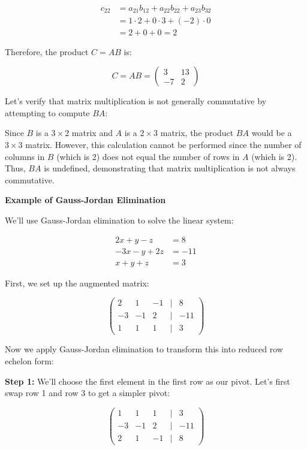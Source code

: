 \begin{align*}
    c_{22} &= a_{21}b_{12} + a_{22}b_{22} + a_{23}b_{32} \\
    &= 1 \cdot 2 + 0 \cdot 3 + (-2) \cdot 0 \\
    &= 2 + 0 + 0 = 2
\end{align*}

Therefore, the product \(C = AB\) is:

\[
    C = AB = 
    \begin{pmatrix}
    3 & 13 \\
    -7 & 2
    \end{pmatrix}
\]

Let's verify that matrix multiplication is not generally commutative by attempting to compute \(BA\):

Since \(B\) is a \(3 \times 2\) matrix and \(A\) is a \(2 \times 3\) matrix, the product \(BA\) would be a \(3 \times 3\) matrix. However, this calculation cannot be performed since the number of columns in \(B\) (which is 2) does not equal the number of rows in \(A\) (which is 2). Thus, \(BA\) is undefined, demonstrating that matrix multiplication is not always commutative.

\textbf{Example of Gauss-Jordan Elimination}

We'll use Gauss-Jordan elimination to solve the linear system:

\begin{align*}
    2x + y - z &= 8 \\
    -3x - y + 2z &= -11 \\
    x + y + z &= 3
\end{align*}

First, we set up the augmented matrix:

\[
    \begin{pmatrix}
    2 & 1 & -1 & | & 8 \\
    -3 & -1 & 2 & | & -11 \\
    1 & 1 & 1 & | & 3
    \end{pmatrix}
\]

Now we apply Gauss-Jordan elimination to transform this into reduced row echelon form:

\textbf{Step 1:} We'll choose the first element in the first row as our pivot. Let's first swap row 1 and row 3 to get a simpler pivot:

\[
    \begin{pmatrix}
    1 & 1 & 1 & | & 3 \\
    -3 & -1 & 2 & | & -11 \\
    2 & 1 & -1 & | & 8
    \end{pmatrix}
\]

